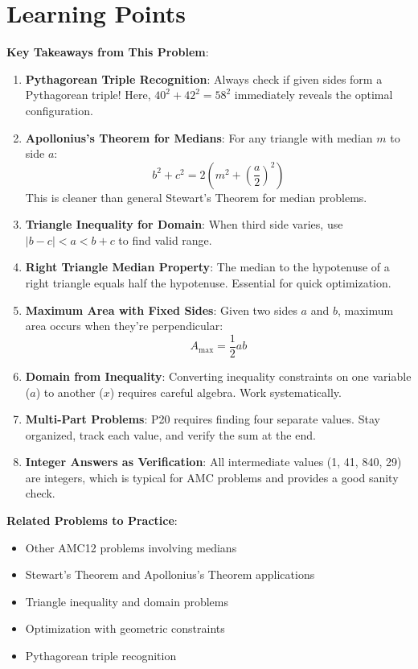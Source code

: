 \documentclass[12pt]{article}
\begin{document}
\section*{Learning Points}

\textbf{Key Takeaways from This Problem}:

\begin{enumerate}
    \item \textbf{Pythagorean Triple Recognition}: Always check if given sides form a Pythagorean triple! Here, $40^2 + 42^2 = 58^2$ immediately reveals the optimal configuration.
    
    \item \textbf{Apollonius's Theorem for Medians}: For any triangle with median $m$ to side $a$:
    $$b^2 + c^2 = 2\left(m^2 + \left(\frac{a}{2}\right)^2\right)$$
    This is cleaner than general Stewart's Theorem for median problems.
    
    \item \textbf{Triangle Inequality for Domain}: When third side varies, use $|b - c| < a < b + c$ to find valid range.
    
    \item \textbf{Right Triangle Median Property}: The median to the hypotenuse of a right triangle equals half the hypotenuse. Essential for quick optimization.
    
    \item \textbf{Maximum Area with Fixed Sides}: Given two sides $a$ and $b$, maximum area occurs when they're perpendicular:
    $$A_{\max} = \frac{1}{2}ab$$
    
    \item \textbf{Domain from Inequality}: Converting inequality constraints on one variable ($a$) to another ($x$) requires careful algebra. Work systematically.
    
    \item \textbf{Multi-Part Problems}: P20 requires finding four separate values. Stay organized, track each value, and verify the sum at the end.
    
    \item \textbf{Integer Answers as Verification}: All intermediate values (1, 41, 840, 29) are integers, which is typical for AMC problems and provides a good sanity check.
\end{enumerate}

\vspace{0.5cm}

\textbf{Related Problems to Practice}:
\begin{itemize}
    \item Other AMC12 problems involving medians
    \item Stewart's Theorem and Apollonius's Theorem applications
    \item Triangle inequality and domain problems
    \item Optimization with geometric constraints
    \item Pythagorean triple recognition
\end{itemize}
\end{document}
